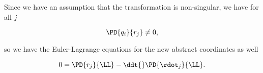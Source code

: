 Since we have an assumption that the transformation is non-singular, we have for all $j$ 

\begin{equation}\label{eqn:classicalMechanicsPs1:440}
\PD{q_i}{r_j} \ne 0,
\end{equation}

so we have the Euler-Lagrange equations for the new abstract coordinates as well

\begin{equation}\label{eqn:classicalMechanicsPs1:460}
0 = \PD{r_j}{\LL} -\ddt{} \PD{\rdot_j}{\LL}.
\end{equation}

\EndNoBibArticle

